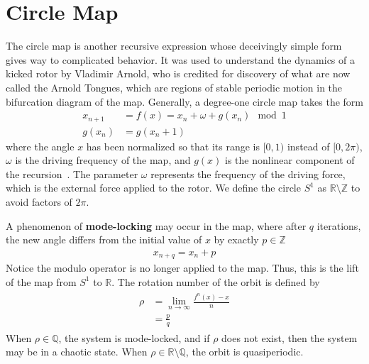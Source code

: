 \section{Circle Map}
The circle map is another
recursive expression whose deceivingly simple form gives way to complicated behavior. It was used to
understand the dynamics of a kicked rotor by Vladimir
Arnold, who is credited for discovery of what are now called the Arnold Tongues, which are
regions of stable periodic motion in the bifurcation diagram of the
map. Generally, a degree-one circle map takes the form
\begin{align*}
x_{n+1}&=f(x)=x_n + \omega + g(x_n) \mod 1\\
g(x_n)&=g(x_n + 1)
\end{align*}
where the angle $x$ has been normalized so that its range is $[0,1)$
instead of $[0,2\pi )$, $\omega$ is the driving frequency of the map, and
$g(x)$ is the nonlinear component of the recursion~\cite{rasband}. The
parameter $\omega$ represents the frequency of the driving
force, which is the external force applied to the
rotor. We define the circle $S^1$ as $\mathbb{R} \setminus \mathbb{Z}$
to avoid factors of $2\pi$.

A phenomenon of \textbf{mode-locking} may occur in the map,
where after $q$ iterations, the new angle differs from the initial
value of $x$ by exactly $p \in \mathbb{Z}$
\begin{align*}
x_{n+q}=x_n+p
\end{align*}
Notice the modulo operator is no longer applied to the map. Thus, this
is the lift of the map from $S^1$ to $\mathbb{R}$. The
rotation number of the orbit is defined by
\begin{align}\label{rho}
\begin{split}
\rho &= \lim_{n \to \infty} \frac{f^n(x)-x}{n}\\
&= \frac{p}{q}
\end{split}
\end{align}
When $\rho \in \mathbb{Q}$, the system is mode-locked, and if $\rho$
does not exist, then the system may be in a chaotic
state. When $\rho \in \mathbb{R} \setminus \mathbb{Q}$, the orbit is quasiperiodic.  

